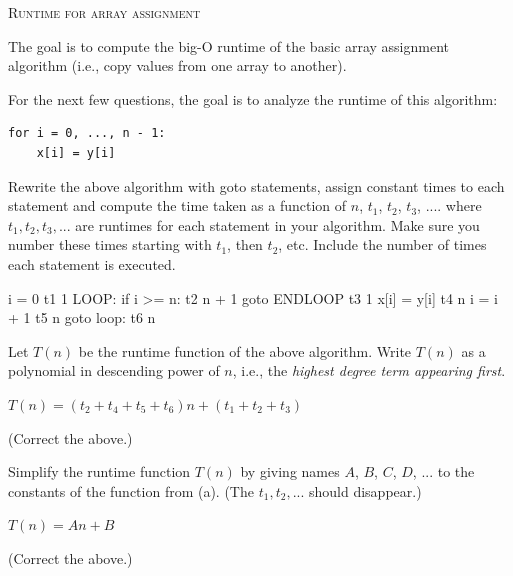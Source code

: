 

\LATEXHELPTHREEFIVEZERO

\TURNPAGE

\newpage
\textsc{Runtime for array assignment}

The goal is to compute the big-O runtime of the basic array
assignment algorithm (i.e., copy values from one array to another).

For the next few questions,
the goal is to analyze the runtime of this algorithm:
\begin{Verbatim}[frame=single]
for i = 0, ..., n - 1:
    x[i] = y[i]
\end{Verbatim}

\nextq
Rewrite the above algorithm with
goto statements, assign constant times to each statement and
compute the time taken as a function of $n$, $t_1$, $t_2$, $t_3$, ....
where $t_1, t_2, t_3, ...$ are runtimes for each statement in your
algorithm. Make sure you
number these times starting with $t_1$, then
$t_2$, etc.
Include the number of times each statement is executed.
\\
\ANSWER
\begin{answercode}
          i = 0                   t1      1
LOOP:     if i >= n:              t2      n + 1
              goto ENDLOOP        t3      1
          x[i] = y[i]             t4      n
          i = i + 1               t5      n
          goto loop:              t6      n
\end{answercode}

\nextq
Let $T(n)$ be the runtime function of the above algorithm.
Write $T(n)$ as a polynomial in descending power of $n$, i.e.,
the \textit{highest degree term appearing first}.
\\
\ANSWER
\begin{answerlong}
$T(n) = (t_{2} + t_{4} + t_{5} + t_{6})n + (t_{1} + t_{2} + t_{3})$
\end{answerlong}
(Correct the above.)

\nextq
Simplify the runtime function $T(n)$
by giving names $A$, $B$, $C$, $D$, ...
to the constants of the function from (a). (The $t_1, t_2, ...$ should
disappear.)
\\
\ANSWER
\begin{answerlong}
$T(n) = A n + B$
\end{answerlong}
(Correct the above.)

